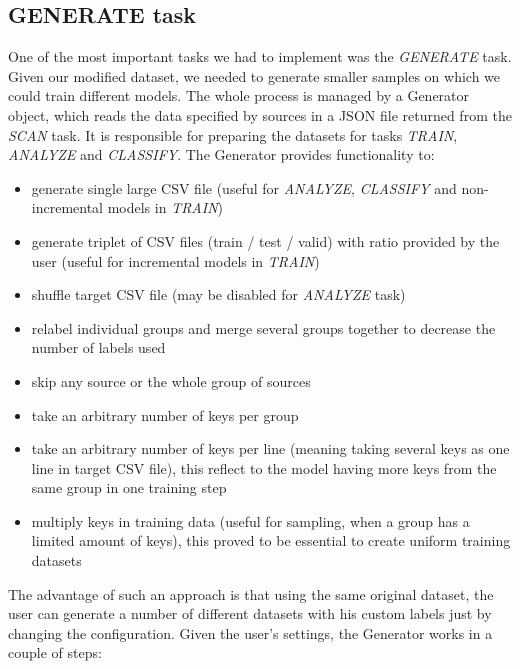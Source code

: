 \subsection{GENERATE task}

One of the most important tasks we had to implement was the \textit{GENERATE} task. Given our modified dataset, we needed to generate smaller samples on which we could train different models. The whole process is managed by a Generator object, which reads the data specified by sources in a JSON file returned from the \textit{SCAN} task. It is responsible for preparing the datasets for tasks \textit{TRAIN}, \textit{ANALYZE} and \textit{CLASSIFY}. The Generator provides functionality to:

\begin{itemize}

\item generate single large CSV file (useful for \textit{ANALYZE}, \textit{CLASSIFY} and non-incremental models in \textit{TRAIN})
\item generate triplet of CSV files (train / test / valid) with ratio provided by the user (useful for incremental models in \textit{TRAIN})
\item shuffle target CSV file (may be disabled for \textit{ANALYZE} task)
\item relabel individual groups and merge several groups together to decrease the number of labels used
\item skip any source or the whole group of sources
\item take an arbitrary number of keys per group
\item take an arbitrary number of keys per line (meaning taking several keys as one line in target CSV file), this reflect to the model having more keys from the same group in one training step
\item multiply keys in training data (useful for sampling, when a group has a limited amount of keys), this proved to be essential to create uniform training datasets

\end{itemize}

The advantage of such an approach is that using the same original dataset, the user can generate a number of different datasets with his custom labels just by changing the configuration. Given the user's settings, the Generator works in a couple of steps:

